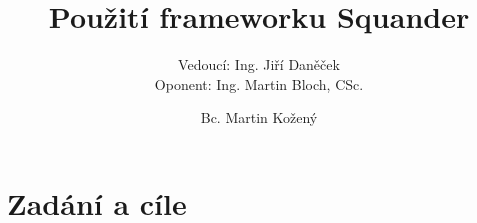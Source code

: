 \documentclass[czech]{beamer}
\title{Použití frameworku Squander}    %
\author{Bc. Martin Kožený}                 %
\subtitle[short subtitle]{Vedoucí: Ing. Jiří Daněček\\
Oponent: Ing. Martin Bloch, CSc.}
\institute{České vysoké učení technické v Praze - Fakulta Elektrotechnická}
\begin{document}
\begin{frame}
  \titlepage
\end{frame}


% 


\section{Zadání a cíle}

% 

\end{document}
